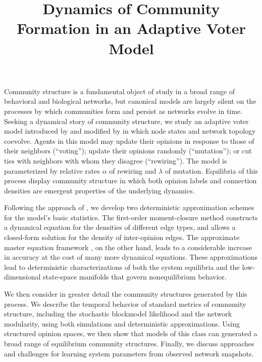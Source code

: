 \documentclass[english, 10pt]{scrartcl}
\title{Dynamics of Community Formation in an Adaptive Voter Model}
\author{}
\date{\vspace{-3ex}}
\begin{document}

\maketitle


Community structure is a fundamental object of study in a broad range of behavioral and biological networks, but canonical models are largely silent on the processes by which communities form and persist as networks evolve in time. Seeking a dynamical story of community structure, we study an adaptive voter model introduced by \cite{Kimura2008} and modified by \cite{Ji2013} in which node states and network topology coevolve. Agents in this model may update their opinions in response to those of their neighbors (``voting''); update their opinions randomly (``mutation''); or cut ties with neighbors with whom they disagree (``rewiring''). The model is parameterized by relative rates $\alpha$ of rewiring and $\lambda$ of mutation. Equilibria of this process display community structure in which both opinion labels and connection densities are emergent properties of the underlying dynamics. 

Following the approach of \cite{Durrett2012}, we develop two deterministic approximation schemes for the model's basic statistics. The first-order moment-closure method constructs a dynamical equation for the densities of different edge types, and allows a closed-form solution for the density of inter-opinion edges. The approximate master equation framework \cite{Gleeson2011}, on the other hand, leads to a considerable increase in accuracy at the cost of many more dynamical equations. These approximations lead to deterministic characterizations of both the system equilibria and the low-dimensional state-space manifolds that govern nonequilibrium behavior. 

We then consider in greater detail the community structures generated by this process. We describe the temporal behavior of standard metrics of community structure, including the stochastic blockmodel likelihood and the network modularity, using both simulations and deterministic approximations. Using structured opinion spaces, we then show that models of this class can generated a broad range of equilibrium community structures. Finally, we discuss approaches and challenges for learning system parameters from observed network snapshots. 
\end{document}
